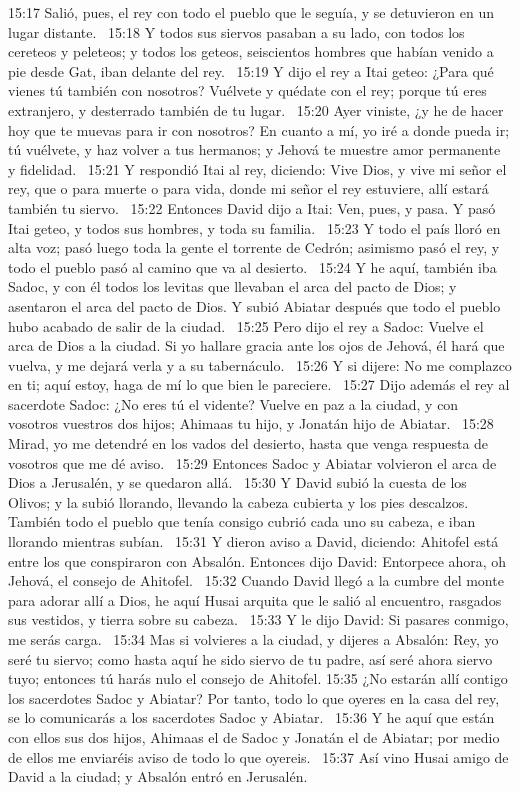 15:17 Salió, pues, el rey con todo el pueblo que le seguía, y se detuvieron en un lugar distante.  
15:18 Y todos sus siervos pasaban a su lado, con todos los cereteos y peleteos; y todos los geteos, seiscientos hombres que habían venido a pie desde Gat, iban delante del rey.  
15:19 Y dijo el rey a Itai geteo: ¿Para qué vienes tú también con nosotros? Vuélvete y quédate con el rey; porque tú eres extranjero, y desterrado también de tu lugar.  
15:20 Ayer viniste, ¿y he de hacer hoy que te muevas para ir con nosotros? En cuanto a mí, yo iré a donde pueda ir; tú vuélvete, y haz volver a tus hermanos; y Jehová te muestre amor permanente y fidelidad.  
15:21 Y respondió Itai al rey, diciendo: Vive Dios, y vive mi señor el rey, que o para muerte o para vida, donde mi señor el rey estuviere, allí estará también tu siervo.  
15:22 Entonces David dijo a Itai: Ven, pues, y pasa. Y pasó Itai geteo, y todos sus hombres, y toda su familia.  
15:23 Y todo el país lloró en alta voz; pasó luego toda la gente el torrente de Cedrón; asimismo pasó el rey, y todo el pueblo pasó al camino que va al desierto.  
15:24 Y he aquí, también iba Sadoc, y con él todos los levitas que llevaban el arca del pacto de Dios; y asentaron el arca del pacto de Dios. Y subió Abiatar después que todo el pueblo hubo acabado de salir de la ciudad.  
15:25 Pero dijo el rey a Sadoc: Vuelve el arca de Dios a la ciudad. Si yo hallare gracia ante los ojos de Jehová, él hará que vuelva, y me dejará verla y a su tabernáculo.  
15:26 Y si dijere: No me complazco en ti; aquí estoy, haga de mí lo que bien le pareciere.  
15:27 Dijo además el rey al sacerdote Sadoc: ¿No eres tú el vidente? Vuelve en paz a la ciudad, y con vosotros vuestros dos hijos; Ahimaas tu hijo, y Jonatán hijo de Abiatar.  
15:28 Mirad, yo me detendré en los vados del desierto, hasta que venga respuesta de vosotros que me dé aviso.  
15:29 Entonces Sadoc y Abiatar volvieron el arca de Dios a Jerusalén, y se quedaron allá.  
15:30 Y David subió la cuesta de los Olivos; y la subió llorando, llevando la cabeza cubierta y los pies descalzos. También todo el pueblo que tenía consigo cubrió cada uno su cabeza, e iban llorando mientras subían.  
15:31 Y dieron aviso a David, diciendo: Ahitofel está entre los que conspiraron con Absalón. Entonces dijo David: Entorpece ahora, oh Jehová, el consejo de Ahitofel.  
15:32 Cuando David llegó a la cumbre del monte para adorar allí a Dios, he aquí Husai arquita que le salió al encuentro, rasgados sus vestidos, y tierra sobre su cabeza.  
15:33 Y le dijo David: Si pasares conmigo, me serás carga.  
15:34 Mas si volvieres a la ciudad, y dijeres a Absalón: Rey, yo seré tu siervo; como hasta aquí he sido siervo de tu padre, así seré ahora siervo tuyo; entonces tú harás nulo el consejo de Ahitofel. 
15:35 ¿No estarán allí contigo los sacerdotes Sadoc y Abiatar? Por tanto, todo lo que oyeres en la casa del rey, se lo comunicarás a los sacerdotes Sadoc y Abiatar.  
15:36 Y he aquí que están con ellos sus dos hijos, Ahimaas el de Sadoc y Jonatán el de Abiatar; por medio de ellos me enviaréis aviso de todo lo que oyereis.  
15:37 Así vino Husai amigo de David a la ciudad; y Absalón entró en Jerusalén.  
